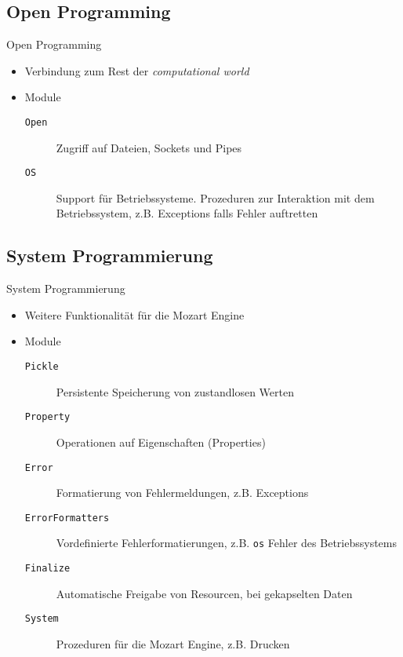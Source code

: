 \subsection{Open Programming}
\begin{frame}{Open Programming}
  \begin{itemize}
    \item Verbindung zum Rest der \textit{computational world}
    \item Module
    \begin{description}
      \item[\texttt{Open}] Zugriff auf Dateien, Sockets und Pipes 
      \item[\texttt{OS}] Support für Betriebssysteme. Prozeduren zur
      Interaktion mit dem Betriebssystem, z.B. Exceptions falls Fehler auftretten
    \end{description}
  \end{itemize}
\end{frame}

\subsection{System Programmierung}
\begin{frame}{System Programmierung}
  \begin{itemize}
    \item Weitere Funktionalität für die Mozart Engine
    \item Module
    \begin{description}
      \item[\texttt{Pickle}] Persistente Speicherung von zustandlosen Werten
      \item[\texttt{Property}] Operationen auf Eigenschaften (Properties)
      \item[\texttt{Error}] Formatierung von Fehlermeldungen, z.B. Exceptions
      \item[\texttt{ErrorFormatters}] Vordefinierte Fehlerformatierungen, z.B.
      \texttt{os} Fehler des Betriebssystems
      \item[\texttt{Finalize}] Automatische Freigabe von Resourcen, bei
      gekapselten Daten
      \item[\texttt{System}] Prozeduren für die Mozart Engine, z.B. Drucken
    \end{description} 
  \end{itemize}
\end{frame}

